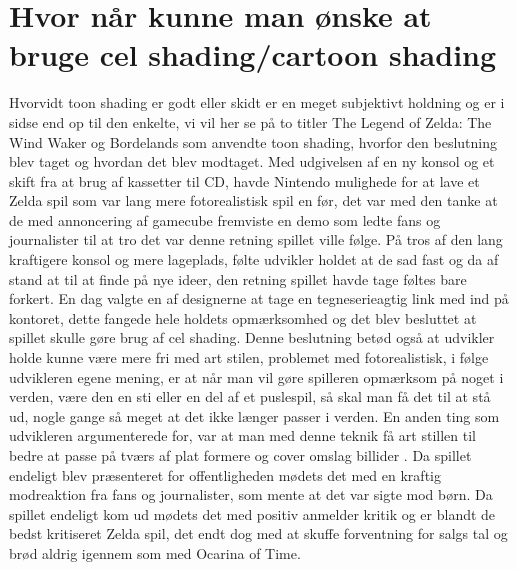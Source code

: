 \section{Hvor når kunne man ønske at bruge cel shading/cartoon shading}

Hvorvidt toon shading er godt eller skidt er en meget subjektivt holdning og er i sidse end op til den enkelte, vi vil her se på to titler The Legend of Zelda: The Wind Waker og Bordelands som anvendte toon shading, hvorfor den beslutning blev taget og hvordan det blev modtaget. Med udgivelsen af en ny konsol og et skift fra at brug af kassetter til CD, havde Nintendo mulighede for at lave et Zelda spil som var lang mere fotorealistisk spil en før, det var med den tanke at de med annoncering af gamecube fremviste en demo\cite{ZeldaOnGameCube} som ledte fans og journalister til at tro det var denne retning spillet ville følge. På tros af den lang kraftigere konsol og mere lageplads, følte udvikler holdet at de sad fast og da af stand at til at finde på nye\cite{ZeldaOnGameCube} ideer,  den retning spillet havde tage føltes bare forkert. En dag valgte en af designerne at tage en tegneserieagtig link  med ind på kontoret, dette fangede hele holdets opmærksomhed og det blev besluttet at spillet skulle gøre brug af cel shading. Denne beslutning betød også at udvikler holde kunne være mere fri med art stilen, problemet med fotorealistisk, i følge udvikleren egene mening, er at når man vil gøre spilleren opmærksom på noget i verden, være den en sti eller en del af et puslespil, så skal man få det til at stå ud, nogle gange så meget at det ikke længer passer i verden. En anden ting som udvikleren argumenterede for, var at man med denne teknik få art stillen til bedre at passe på tværs af plat formere og cover omslag billider . Da spillet endeligt blev præsenteret for offentligheden mødets det med en kraftig modreaktion fra fans og journalister, som mente at det var sigte mod børn. Da spillet endeligt kom ud mødets det med positiv anmelder kritik  og er blandt de bedst kritiseret Zelda spil, det endt dog med at skuffe forventning for salgs tal og brød aldrig igennem som med Ocarina of Time.
